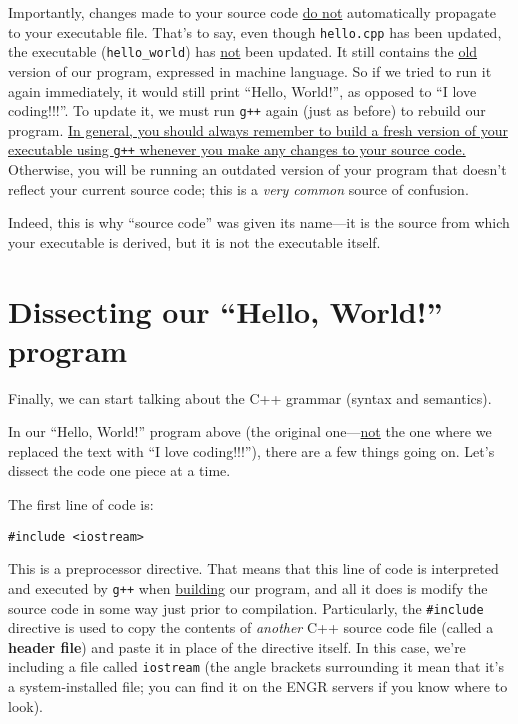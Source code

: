 \documentclass{article}
\begin{document}
Importantly, changes made to your source code \ul{do not} automatically propagate to your executable file. That's to say, even though \texttt{hello.cpp} has been updated, the executable (\texttt{hello\_world}) has \ul{not} been updated. It still contains the \ul{old} version of our program, expressed in machine language. So if we tried to run it again immediately, it would still print ``Hello, World!'', as opposed to ``I love coding!!!''. To update it, we must run \texttt{g++} again (just as before) to rebuild our program. \ul{In general, you should always remember to build a fresh version of your executable using \texttt{g++} whenever you make any changes to your source code.} Otherwise, you will be running an outdated version of your program that doesn't reflect your current source code; this is a \textit{very common} source of confusion.

Indeed, this is why ``source code'' was given its name---it is the source from which your executable is derived, but it is not the executable itself.

\section{Dissecting our ``Hello, World!'' program}

Finally, we can start talking about the C++ grammar (syntax and semantics).

In our ``Hello, World!'' program above (the original one---\ul{not} the one where we replaced the text with ``I love coding!!!''), there are a few things going on. Let's dissect the code one piece at a time.

The first line of code is:

\begin{verbatim}
#include <iostream>
\end{verbatim}

This is a preprocessor directive. That means that this line of code is interpreted and executed by \texttt{g++} when \ul{building} our program, and all it does is modify the source code in some way just prior to compilation. Particularly, the \texttt{\#include} directive is used to copy the contents of \textit{another} C++ source code file (called a \textbf{header file}) and paste it in place of the directive itself. In this case, we're including a file called \texttt{iostream} (the angle brackets surrounding it mean that it's a system-installed file; you can find it on the ENGR servers if you know where to look).
\end{document}
